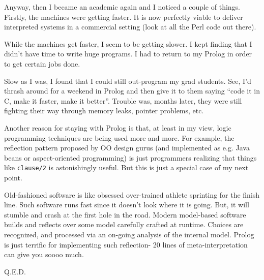Anyway, then I became an academic again and I noticed a couple of things. Firstly,
the machines were getting faster. It is now perfectly viable to deliver interpreted systems in a commercial setting
(look at all the Perl code out there).

While the machines get faster, I seem to be getting slower. I kept finding that I
didn't have time to write huge programs.
I had to return to my Prolog in order to get certain jobs done.

Slow as I was, I found that I could still out-program my
grad students.
See, I'd thrash around for a weekend
in Prolog and then give it to them saying ``code it in C, make it faster,
make it better''. Trouble was, months later, they were still fighting their way through memory
leaks, pointer problems, etc.

Another reason for staying with Prolog is that,
at least in my view,  logic programming techniques are being used more and more.
For example, the reflection pattern proposed by OO design gurus (and implemented as e.g.
Java beans or aspect-oriented programming)
is just programmers realizing that things like {\tt clause/2} is astonishingly useful. But this is
just a special case of my next point.

Old-fashioned software is like obsessed over-trained athlete sprinting for the finish line.
Such software
runs fast since it doesn't look where it is going. But, it  will
stumble and crash at the first  hole in the road.
Modern model-based
software builds and reflects over some model carefully crafted at runtime. Choices are recognized,
and processed  via an on-going  analysis of the internal model.
Prolog is just  terrific for implementing
such reflection- 20 lines of meta-interpretation can give you soooo much.

Q.E.D.

